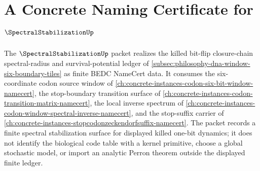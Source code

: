 \chapter{A Concrete Naming Certificate for $\SpectralStabilizationUp$}
\label{ch:concrete-instances-spectral-stabilization-namecert}

The $\SpectralStabilizationUp$ packet realizes the killed bit-flip closure-chain spectral-radius and survival-potential ledger of \autoref{subsec:philosophy-dna-window-six-boundary-tiles} as finite BEDC NameCert data. It consumes the six-coordinate codon source window of \autoref{ch:concrete-instances-codon-six-bit-window-namecert}, the stop-boundary transition surface of \autoref{ch:concrete-instances-codon-transition-matrix-namecert}, the local inverse spectrum of \autoref{ch:concrete-instances-codon-window-spectral-inverse-namecert}, and the stop-suffix carrier of \autoref{ch:concrete-instances-stopcodonzeckendorfsuffix-namecert}. The packet records a finite spectral stabilization surface for displayed killed one-bit dynamics; it does not identify the biological code table with a kernel primitive, choose a global stochastic model, or import an analytic Perron theorem outside the displayed finite ledger.

